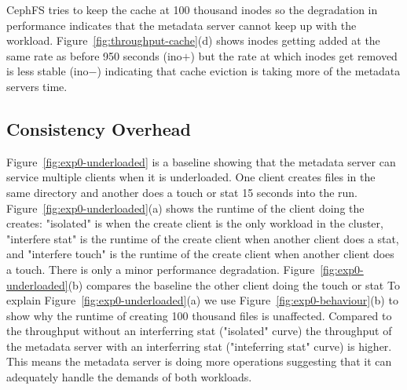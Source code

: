 CephFS tries to keep the cache at 100 thousand inodes so the degradation in
performance indicates that the metadata server cannot keep up with the
workload. Figure~\ref{fig:throughput-cache}(d) shows inodes getting added at
the same rate as before 950 seconds (ino\(+\)) but the rate at which inodes get
removed is less stable (ino\(-\)) indicating that cache eviction is taking more
of the metadata servers time.

\subsection{Consistency Overhead}

Figure~\ref{fig:exp0-underloaded} is a baseline showing that the metadata
server can service multiple clients when it is underloaded. One client creates
files in the same directory and another does a touch or stat 15 seconds into
the run. Figure~\ref{fig:exp0-underloaded}(a) shows the runtime of the client
doing the creates: "isolated" is when the create client is the only workload in
the cluster, "interfere stat" is the runtime of the create client when another
client does a stat, and "interfere touch" is the runtime of the create client
when another client does a touch. There is only a minor performance
degradation. Figure~\ref{fig:exp0-underloaded}(b) compares the baseline
the other client doing the touch or stat
%
%
%
%
%
To explain Figure~\ref{fig:exp0-underloaded}(a) we use
Figure~\ref{fig:exp0-behaviour}(b) to show why the runtime of creating 100
thousand files is unaffected. Compared to the throughput without an
interferring stat ("isolated" curve) the throughput of the metadata server with
an interferring stat ("inteferring stat" curve) is higher. This means the
metadata server is doing more operations suggesting that it can adequately
handle the demands of both workloads.  

